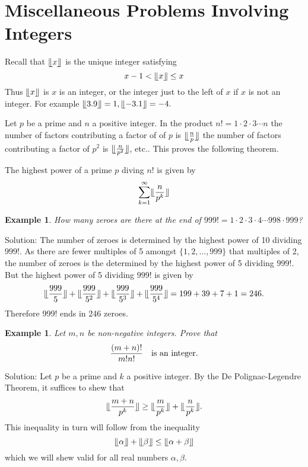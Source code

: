 \documentclass[11pt, openany]{book}
\theoremstyle{change} \theoremheaderfont{\blue\sffamily\bfseries}
\newtheorem{exa}[thm]{Example}
\theoremstyle{nonumberplain} \theoremheaderfont{\sffamily\bfseries}
\newcommand{\í}{\'{\i}}
\begin{document}
\section{Miscellaneous Problems Involving
Integers}

Recall that $\llfloor x\rrfloor$ is the unique integer satisfying
\begin{equation}
x - 1 < \llfloor x\rrfloor \leq x
\end{equation}
Thus $\llfloor x\rrfloor$ is $x$ is an integer, or the integer just
to the left of $x$ if $x$ is not an integer. For example $\llfloor
3.9\rrfloor = 1, \llfloor -3.1\rrfloor = -4.$



     Let $p$ be a prime and $n$ a positive integer. In the product
$n! = 1\cdot 2\cdot 3\cdots n$ the number of factors contributing a
factor of of $p$ is $\llfloor \frac{n}{p}\rrfloor $ the number of
factors contributing a factor of $p^2$ is $\llfloor
\frac{n}{p^2}\rrfloor$, etc.. This proves the following theorem.

\begin{thm} The highest power of a prime $p$ diving $n!$
is given by
\begin{equation}
\sum _{k = 1} ^\infty \llfloor \frac{n}{p^k}\rrfloor
\end{equation}
\end{thm}


\begin{exa} How many zeroes are there at the end of $999! = 1\cdot 2\cdot 3\cdot 4\cdots 998\cdot 999$? \end{exa}
Solution: The number of zeroes is determined by the highest power
of 10 dividing $999!$. As there are fewer multiples of 5 amongst
$\{1, 2, \ldots , 999\}$ that multiples of 2, the number of zeroes
is the determined by the highest power of 5 dividing $999!$. But
the highest power of 5 dividing $999!$ is given by
$$\llfloor\frac{999}{5}\rrfloor + \llfloor\frac{999}{5^2}\rrfloor + \llfloor\frac{999}{5^3}\rrfloor
+ \llfloor\frac{999}{5^4} \rrfloor = 199 + 39 + 7 + 1 =
246.$$Therefore 999! ends in  246 zeroes.
\begin{exa}
Let $m, n$ be non-negative integers. Prove that
\begin{equation}
\frac{(m + n)!}{m!n!} \ \ \  {\rm is \ an \ integer.}
\end{equation}
\end{exa}
Solution: Let $p$ be a prime and $k$ a positive integer. By the De
Polignac-Legendre Theorem, it suffices to shew that
$$\llfloor\frac{m  + n}{p^k}\rrfloor \geq \llfloor\frac{m}{p^k}\rrfloor + \llfloor\frac{n}{p^k}\rrfloor .$$
This inequality in turn will follow from the inequality
\begin{equation}
\llfloor \alpha\rrfloor + \llfloor\beta\rrfloor \leq \llfloor\alpha
+ \beta\rrfloor
\end{equation}which we will shew  valid for all real numbers $\alpha, \beta$.
\end{document}

